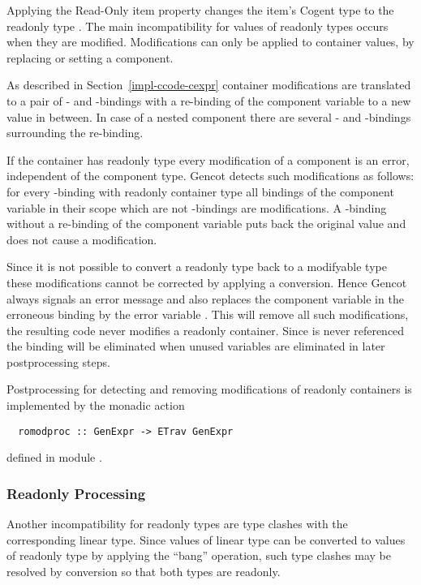 Applying the Read-Only item property changes the item's Cogent type  to the readonly type . The main incompatibility
for values of readonly types occurs when they are modified. Modifications can only be applied to container values, by replacing
or setting a component.

As described in Section~\ref{impl-ccode-cexpr} container modifications are translated to a pair of - and -bindings
with a re-binding of the component variable to a new value in between. In case of a nested component there are several -
and -bindings surrounding the re-binding.

If the container has readonly type every modification of a component is an error, independent of the component type. Gencot detects
such modifications as follows: for every -binding with readonly container type all bindings of the component
variable in their scope which are not -bindings are modifications. A -binding without a re-binding of the
component variable puts back the original value and does not cause a modification.

Since it is not possible to convert a readonly type back to a modifyable type these modifications cannot be corrected by
applying a conversion. Hence Gencot always signals an error message and also replaces the component variable in the erroneous
binding by the error variable . This will remove all such modifications, the resulting code never modifies a
readonly container. Since  is never referenced the binding will be eliminated when unused variables are eliminated
in later postprocessing steps.

Postprocessing for detecting and removing modifications of readonly containers is implemented by the monadic action
\begin{verbatim}
  romodproc :: GenExpr -> ETrav GenExpr
\end{verbatim}
defined in module .

\subsubsection{Readonly Processing}

Another incompatibility for readonly types are type clashes with the corresponding linear type. Since values of linear type
can be converted to values of readonly type by applying the ``bang'' operation, such type clashes may be resolved by conversion
so that both types are readonly.

